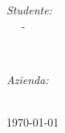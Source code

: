\begin{titlepage}
    \vspace{1cm}
    
    \begin{minipage}{0.4\textwidth}
        \begin{flushleft} \large
            \emph{Studente:}\\
            \nomeStudente\ \textsc{\cognomeStudente\ } - \matricolaStudente
        \end{flushleft}
    \end{minipage}
    ~
    \begin{minipage}{0.4\textwidth}
        \begin{flushright} \large
            \emph{Azienda:} \\
            \ragioneSocAzienda
        \end{flushright}
    \end{minipage}\\[2cm]
    
    
    {\large \today}\\[0.5cm] %
    
    
    \vfill 
    
\end{titlepage}